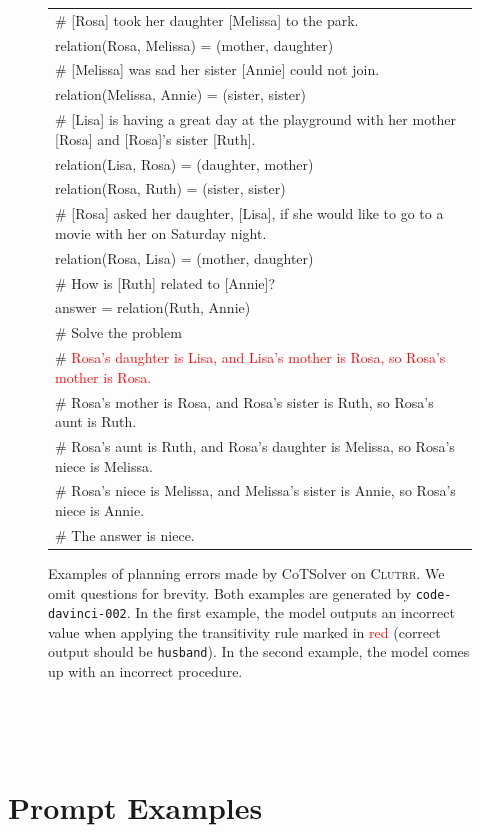 \documentclass{article}
\theoremstyle{definition}
\newcommand\ttsmall[1]{\texttt{\small #1}}
\newcommand{\clutrr}{\textsc{Clutrr}}
\begin{document}
\begin{figure}[h]
\begin{tabularx}{\linewidth}{X}
         \midrule
    \# [Rosa] took her daughter [Melissa] to the park.\\
    relation(Rosa, Melissa) = (mother, daughter)\\
    \# [Melissa] was sad her sister [Annie] could not join.\\
    relation(Melissa, Annie) = (sister, sister)\\
    \# [Lisa] is having a great day at the playground with her mother [Rosa] and [Rosa]'s sister [Ruth].\\
    relation(Lisa, Rosa) = (daughter, mother)\\
    relation(Rosa, Ruth) = (sister, sister)\\
    \# [Rosa] asked her daughter, [Lisa], if she would like to go to a movie with her on Saturday night.\\
    relation(Rosa, Lisa) = (mother, daughter)\\
    \# How is [Ruth] related to [Annie]?\\
    answer = relation(Ruth, Annie)\\
    \# Solve the problem\\
    \# \textcolor{red}{Rosa's daughter is Lisa, and Lisa's mother is Rosa, so Rosa's mother is Rosa.}\\
    \# Rosa's mother is Rosa, and Rosa's sister is Ruth, so Rosa's aunt is Ruth.\\
    \# Rosa's aunt is Ruth, and Rosa's daughter is Melissa, so Rosa's niece is Melissa.\\
    \# Rosa's niece is Melissa, and Melissa's sister is Annie, so Rosa's niece is Annie.\\
    \# The answer is niece.\\
\bottomrule
    \end{tabularx}
    \caption{Examples of planning errors made by {\sc CoTSolver} on \clutrr{}. We omit questions for brevity. Both examples are generated by \ttsmall{code-davinci-002}. In the first example, the model outputs an incorrect value when applying the transitivity rule marked in \textcolor{red}{red} (correct output should be \texttt{husband}). In the second example, the model comes up with an incorrect procedure.  }
    \label{fig:clutrr_cotsolver_err}
\end{figure}

\newpage
\textcolor{white}{something}

\newpage
\textcolor{white}{something}
\newpage

\section{Prompt Examples}
\label{app:detailed_prompts}
\end{document}
